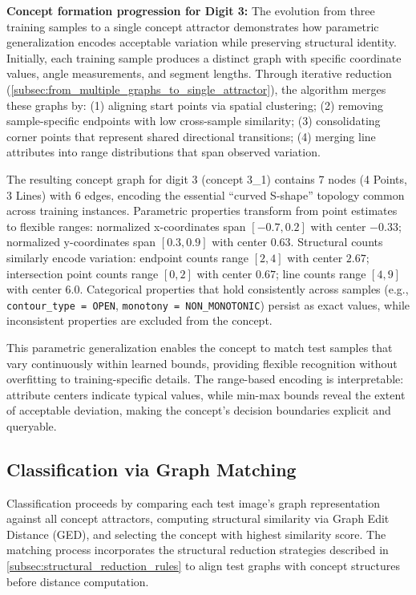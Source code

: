 \documentclass[runningheads]{llncs}
\begin{document}
\textbf{Concept formation progression for Digit 3:} The evolution from three training samples to a single concept attractor demonstrates how parametric generalization encodes acceptable variation while preserving structural identity. Initially, each training sample produces a distinct graph with specific coordinate values, angle measurements, and segment lengths. Through iterative reduction (\autoref{subsec:from_multiple_graphs_to_single_attractor}), the algorithm merges these graphs by: (1) aligning start points via spatial clustering; (2) removing sample-specific endpoints with low cross-sample similarity; (3) consolidating corner points that represent shared directional transitions; (4) merging line attributes into range distributions that span observed variation.

The resulting concept graph for digit 3 (concept 3\_1) contains 7 nodes (4 Points, 3 Lines) with 6 edges, encoding the essential ``curved S-shape'' topology common across training instances. Parametric properties transform from point estimates to flexible ranges: normalized x-coordinates span $[-0.7, 0.2]$ with center $-0.33$; normalized y-coordinates span $[0.3, 0.9]$ with center $0.63$. Structural counts similarly encode variation: endpoint counts range $[2, 4]$ with center $2.67$; intersection point counts range $[0, 2]$ with center $0.67$; line counts range $[4, 9]$ with center $6.0$. Categorical properties that hold consistently across samples (e.g., \texttt{contour\_type = OPEN}, \texttt{monotony = NON\_MONOTONIC}) persist as exact values, while inconsistent properties are excluded from the concept.

This parametric generalization enables the concept to match test samples that vary continuously within learned bounds, providing flexible recognition without overfitting to training-specific details. The range-based encoding is interpretable: attribute centers indicate typical values, while min-max bounds reveal the extent of acceptable deviation, making the concept's decision boundaries explicit and queryable.

\subsection{Classification via Graph Matching}

Classification proceeds by comparing each test image's graph representation against all concept attractors, computing structural similarity via Graph Edit Distance (GED), and selecting the concept with highest similarity score. The matching process incorporates the structural reduction strategies described in \autoref{subsec:structural_reduction_rules} to align test graphs with concept structures before distance computation.
\end{document}
